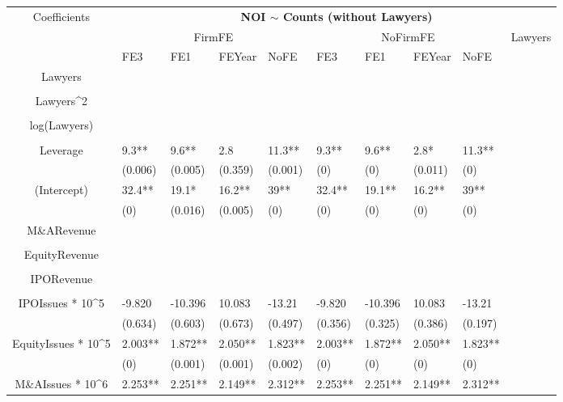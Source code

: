 \documentclass{article}
\begin{document}
\begin{table}[H]
\centering
\begin{tabular}{|clllllllll|}
\hline
\multirow{3}{*}{Coefficients} & \multicolumn{9}{c|}{\textbf{NOI $\sim$ Counts (without Lawyers)}} \\
\cline{2-10}
& \multicolumn{4}{c}{FirmFE} & \multicolumn{4}{c}{NoFirmFE} & \multirow{2}{*}{Lawyers} \\
\cline{2-9}
& FE3 & FE1 & FEYear & NoFE & FE3 & FE1 & FEYear & NoFE &  \\
\hline
 
Lawyers &  &  &  &  &  &  &  &  & \\ 
   &  &  &  &  &  &  &  &  & \\ 
  Lawyers^2 &  &  &  &  &  &  &  &  & \\ 
   &  &  &  &  &  &  &  &  & \\ 
  log(Lawyers) &  &  &  &  &  &  &  &  & \\ 
   &  &  &  &  &  &  &  &  & \\ 
  Leverage & 9.3** & 9.6** & 2.8 & 11.3** & 9.3** & 9.6** & 2.8* & 11.3** & \\ 
   & (0.006) & (0.005) & (0.359) & (0.001) & (0) & (0) & (0.011) & (0) & \\ 
  (Intercept) & 32.4** & 19.1* & 16.2** & 39** & 32.4** & 19.1** & 16.2** & 39** & \\ 
   & (0) & (0.016) & (0.005) & (0) & (0) & (0) & (0) & (0) & \\ 
  M\&ARevenue &  &  &  &  &  &  &  &  & \\ 
   &  &  &  &  &  &  &  &  & \\ 
  EquityRevenue &  &  &  &  &  &  &  &  & \\ 
   &  &  &  &  &  &  &  &  & \\ 
  IPORevenue &  &  &  &  &  &  &  &  & \\ 
   &  &  &  &  &  &  &  &  & \\ 
  IPOIssues * 10^5 & -9.820 & -10.396 & 10.083 & -13.21 & -9.820 & -10.396 & 10.083 & -13.21 & \\ 
   & (0.634) & (0.603) & (0.673) & (0.497) & (0.356) & (0.325) & (0.386) & (0.197) & \\ 
  EquityIssues * 10^5 & 2.003** & 1.872** & 2.050** & 1.823** & 2.003** & 1.872** & 2.050** & 1.823** & \\ 
   & (0) & (0.001) & (0.001) & (0.002) & (0) & (0) & (0) & (0) & \\ 
  M\&AIssues * 10^6 & 2.253** & 2.251** & 2.149** & 2.312** & 2.253** & 2.251** & 2.149** & 2.312** & \\ 

\end{tabular}
\end{table}
\end{document}

